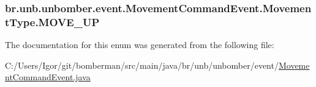\hypertarget{enumbr_1_1unb_1_1unbomber_1_1event_1_1_movement_command_event_1_1_movement_type_a7034b5391ac60699e4d2856185fc1070}{
\subsubsection[{M\+O\+V\+E\+\_\+\+U\+P}]{\setlength{\rightskip}{0pt plus 5cm}br.\+unb.\+unbomber.\+event.\+Movement\+Command\+Event.\+Movement\+Type.\+M\+O\+V\+E\+\_\+\+U\+P}}\label{enumbr_1_1unb_1_1unbomber_1_1event_1_1_movement_command_event_1_1_movement_type_a7034b5391ac60699e4d2856185fc1070}


The documentation for this enum was generated from the following file\+:\begin{DoxyCompactItemize}
\item 
C\+:/\+Users/\+Igor/git/bomberman/src/main/java/br/unb/unbomber/event/\hyperlink{_movement_command_event_8java}{Movement\+Command\+Event.\+java}\end{DoxyCompactItemize}
